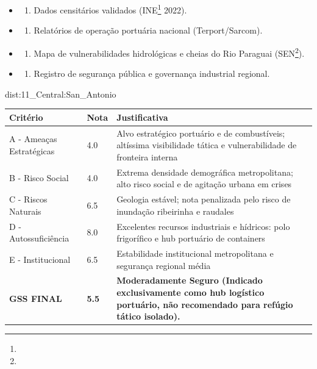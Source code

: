 {\begin{itemize}
\tightlist
\item
  \begin{enumerate}
  \def\labelenumi{\arabic{enumi})}
  \tightlist
  \item
    Dados censitários validados (INE\footnote{\fineINE} 2022).
  \end{enumerate}
\item
  \begin{enumerate}
  \def\labelenumi{\arabic{enumi})}
  \setcounter{enumi}{1}
  \tightlist
  \item
    Relatórios de operação portuária nacional (Terport/\allowbreak Sarcom).
  \end{enumerate}
\item
  \begin{enumerate}
  \def\labelenumi{\arabic{enumi})}
  \setcounter{enumi}{2}
  \tightlist
  \item
    Mapa de vulnerabilidades hidrológicas e cheias do Rio Paraguai
    (SEN\footnote{\fineSEN}).
  \end{enumerate}
\item
  \begin{enumerate}
  \def\labelenumi{\arabic{enumi})}
  \setcounter{enumi}{3}
  \tightlist
  \item
    Registro de segurança pública e governança industrial regional.
  \end{enumerate}
\end{itemize}}{dist:11_Central:San_Antonio}
\begin{table}[ht!]
\small \begin{tabular}{p{3.0cm}p{0.8cm}p{6.0cm}} \toprule
\textbf{Critério} & \textbf{Nota} & \textbf{Justificativa} \\ \midrule
A - Ameaças Estratégicas & 4.0 & Alvo estratégico portuário e de combustíveis; altíssima visibilidade tática e vulnerabilidade de fronteira interna \\
B - Risco Social & 4.0 & Extrema densidade demográfica metropolitana; alto risco social e de agitação urbana em crises \\
C - Riscos Naturais & 6.5 & Geologia estável; nota penalizada pelo risco de inundação ribeirinha e raudales \\
D - Autossuficiência & 8.0 & Excelentes recursos industriais e hídricos: polo frigorífico e hub portuário de containers \\
E - Institucional & 6.5 & Estabilidade institucional metropolitana e segurança regional média \\
\midrule \textbf{GSS FINAL} & \textbf{5.5} & \textbf{Moderadamente Seguro (Indicado exclusivamente como hub logístico portuário, não recomendado para refúgio tático isolado).} \\ \bottomrule \end{tabular}
\end{table}
